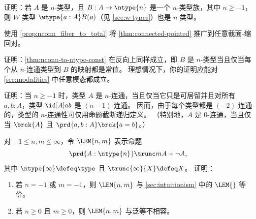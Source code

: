 \begin{ex}\label{ex:ntypes-closed-under-wtypes}
  证明：若 $A$ 是 $n$-类型，且 $B:A\to \ntype{n}$ 是一个 $n$-类型族，其中 $n\ge -1$，则 $W$-类型 $\wtype{a:A} B(a)$（见 \cref{sec:w-types}）也是 $n$-类型。
\end{ex}

\begin{ex}\label{ex:connected-pointed-all-section-retraction}
  使用 \cref{prop:nconn_fiber_to_total} 将 \cref{thm:connected-pointed} 推广到任意截面-缩回对。
\end{ex}

\begin{ex}\label{ex:ntype-from-nconn-const}
  证明：\cref{thm:nconn-to-ntype-const} 在反向上同样成立，即 $B$ 是 $n$-类型当且仅当每个从 $n$-连通类型到 $B$ 的映射都是常值。
  理想情况下，你的证明应能对 \cref{sec:modalities} 中任意模态都成立。
\end{ex}

\begin{ex}\label{ex:connectivity-inductively}
  证明：当 $n\ge -1$ 时，类型 $A$ 是 $n$-连通，当且仅当它只是可居留并且对所有 $a,b:A$，类型 $\id[A]ab$ 是 $(n-1)$-连通。
  因而，由于每个类型都是 $(-2)$-连通的，类型的 $n$-连通性可仅用命题截断递归定义。
  （特别地，$A$ 是 0-连通，当且仅当 $\brck{A}$ 且 $\prd{a,b:A} \brck{a=b}$。）
\end{ex}

\begin{ex}\label{ex:lemnm}
  对 $-1\le n,m \le\infty$，令 $\LEM{n,m}$ 表示命题
  \[ \prd{A:\ntype{n}} \trunc m{A + \neg A},\]
  其中 $\ntype{\infty} \defeq \type$ 且 $\trunc{\infty}{X}\defeq X$。
  证明：
  \begin{enumerate}
  \item 若 $n=-1$ 或 $m=-1$，则 $\LEM{n,m}$ 与 \cref{sec:intuitionism} 中的 $\LEM{}$ 等价。
  \item 若 $n\ge 0$ 且 $m\ge 0$，则 $\LEM{n,m}$ 与泛等不相容。
  \end{enumerate}
\end{ex}

